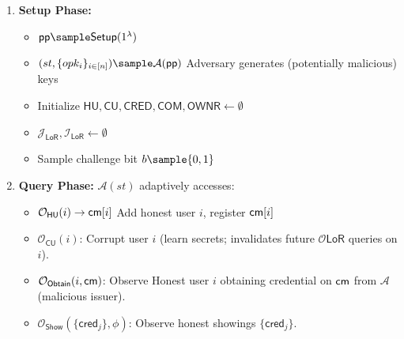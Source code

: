 \begin{enumerate}
    \item \textbf{Setup Phase:}
    \begin{itemize}
        \item $\ppar \sample \mathsf{Setup}(1^\lambda)$
        \item $(st, \{opk_i\}_{i \in [n]}) \sample \mathcal{A}(\ppar)$ Adversary generates (potentially malicious) keys
        \item Initialize $\mathsf{HU}, \mathsf{CU}, \mathsf{CRED}, \mathsf{COM}, \mathsf{OWNR} \gets \emptyset$
        \item $\mathcal{J}_{\mathsf{LoR}}, \mathcal{I}_{\mathsf{LoR}} \gets \emptyset$ 
        \item Sample challenge bit $b \sample \{0,1\}$
    \end{itemize}

    \item \textbf{Query Phase:} $\mathcal{A}(st)$ adaptively accesses:
    \begin{itemize}
        \item $\mathcal{O}_{\mathsf{HU}}(i) \rightarrow \mathsf{cm}[i]$ Add honest user $i$, register $\mathsf{cm}[i]$
        
        \item $\mathcal{O}_{\mathsf{CU}}(i)$: Corrupt user $i$ (learn secrets; invalidates future $\mathcal{O}{\mathsf{LoR}}$ queries on $i$).  
        
        \item $\mathcal{O}_{\mathsf{Obtain}}(i, \mathsf{cm})$: Observe Honest user $i$ obtaining credential on $\mathsf{cm}$ from $\mathcal{A}$ (malicious issuer).
        
        \item $\mathcal{O}_{\mathsf{Show}}(\{\mathsf{cred}_j\}, \phi)$: Observe honest showings $\{\mathsf{cred}_j\}$. 
        

\end{itemize}
\end{enumerate}
